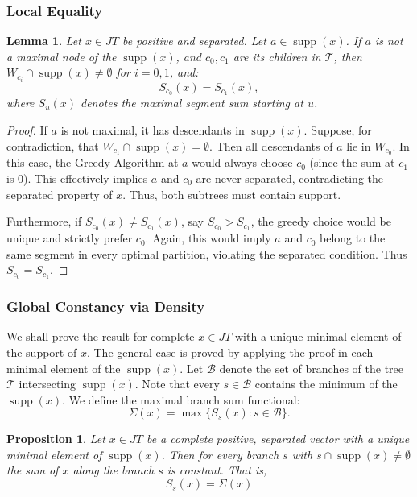 \documentclass[11pt,a4paper]{amsart}
\newtheorem{proposition}[theorem]{Proposition}
\newtheorem{lemma}[theorem]{Lemma}
\newcommand{\JT}{JT}
\newcommand{\Tree}{\mathcal{T}}
\newcommand{\supp}{\operatorname{supp}}
\newcommand{\Branches}{\mathcal{B}}
\begin{document}
\subsubsection{Local Equality}

\begin{lemma}\label{lemma5.15}
    Let $x \in \JT$ be positive and separated. Let $a \in \supp(x)$. If $a$ is not a maximal node of the $\supp(x)$, and $c_0, c_1$ are its children in $\Tree$, then $W_{c_i} \cap \supp(x) \neq \emptyset$ for $i=0,1$, and:
    \[ S_{c_0}(x) = S_{c_1}(x), \]
    where $S_u(x)$ denotes the maximal segment sum starting at $u$.
\end{lemma}

\begin{proof}
    If $a$ is not maximal, it has descendants in $\supp(x)$. Suppose, for contradiction, that $W_{c_1} \cap \supp(x) = \emptyset$. Then all descendants of $a$ lie in $W_{c_0}$. In this case, the Greedy Algorithm at $a$ would always choose $c_0$ (since the sum at $c_1$ is 0). This effectively implies $a$ and $c_0$ are never separated, contradicting the separated property of $x$. Thus, both subtrees must contain support.
    
    Furthermore, if $S_{c_0}(x) \neq S_{c_1}(x)$, say $S_{c_0} > S_{c_1}$, the greedy choice would be unique and strictly prefer $c_0$. Again, this would imply $a$ and $c_0$ belong to the same segment in every optimal partition, violating the separated condition. Thus $S_{c_0} = S_{c_1}$.
\end{proof}

\subsubsection{Global Constancy via Density}

We shall prove the result for complete $x\in \JT$ with a unique minimal element of the support of $x$. The general case is proved by applying the proof in each minimal element of the $\supp(x)$. Let 
$\Branches$ denote the set of branches of the tree $\Tree$ intersecting $\supp(x)$. Note that every $s\in \Branches$ contains the minimum of the $\supp(x)$. We define the maximal branch sum functional:
\[ \Sigma(x) = \max \{ S_s(x) : s \in \Branches \}. \]

\begin{proposition}
    Let $x \in \JT$ be a complete positive, separated vector with a unique minimal  element of $\supp(x)$. Then for every branch $s$ with $s\cap \supp(x) \ne \emptyset$ the sum of $x$ along the branch $s$   is constant. That is,  $$S_s(x) = \Sigma(x)$$
\end{proposition}
\end{document}
